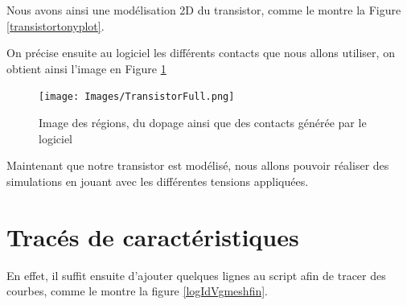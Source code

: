 \documentclass[a4paper,11pt]{report}
\begin{document}
Nous avons ainsi une modélisation 2D du transistor, comme le montre la Figure \ref{transistortonyplot}.

On précise ensuite au logiciel les différents contacts que nous allons utiliser, on obtient ainsi l'image en Figure \ref{TransistorFull}

\begin{figure}[H]
    \centering
    \texttt{[image: Images/TransistorFull.png]}
    \caption{Image des régions, du dopage ainsi que des contacts générée par le logiciel}
    \label{TransistorFull}
\end{figure}

Maintenant que notre transistor est modélisé, nous allons pouvoir réaliser des simulations en jouant avec les différentes tensions appliquées.

\section{Tracés de caractéristiques}

En effet, il suffit ensuite d'ajouter quelques lignes au script afin de tracer des courbes, comme le montre la figure \ref{logIdVgmeshfin}.

\noindent{}
\end{document}
